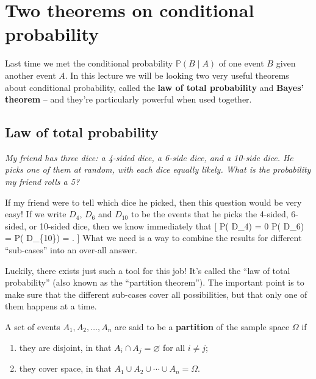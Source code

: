 \documentclass[
  letterpaper,
]{report}
\providecommand{\tightlist}{%
  \setlength{\itemsep}{0pt}\setlength{\parskip}{0pt}}\usepackage{longtable,booktabs,array}
\theoremstyle{definition}
\theoremstyle{definition}
\theoremstyle{remark}
\begin{document}
\hypertarget{L08-two-theorems}{%
\chapter{Two theorems on conditional
probability}\label{L08-two-theorems}}

Last time we met the conditional probability \(\mathbb P(B \mid A)\) of
one event \(B\) given another event \(A\). In this lecture we will be
looking two very useful theorems about conditional probability, called
the \textbf{law of total probability} and \textbf{Bayes' theorem} -- and
they're particularly powerful when used together.

\hypertarget{total-prob}{%
\section{Law of total probability}\label{total-prob}}

\leavevmode{}%
\emph{My friend has three dice: a 4-sided dice, a 6-side dice, and a
10-side dice. He picks one of them at random, with each dice equally
likely. What is the probability my friend rolls a 5?}

If my friend were to tell which dice he picked, then this question would
be very easy! If we write \(D_4\), \(D_6\) and \(D_{10}\) to be the
events that he picks the 4-sided, 6-sided, or 10-sided dice, then we
know immediately that {[} \mathbb P( \mid D\_4) = 0
\qquad \mathbb P( \mid D\_6) = 
\qquad \mathbb P( \mid D\_\{10\}) =  . {]}
What we need is a way to combine the results for different ``sub-cases''
into an over-all answer.

Luckily, there exists just such a tool for this job! It's called the
``law of total probability'' (also known as the ``partition theorem'').
The important point is to make sure that the different sub-cases cover
all possibilities, but that only one of them happens at a time.

A set of events \(A_1, A_2, \dots, A_n\) are said to be a
\textbf{partition} of the sample space \(\Omega\) if

\begin{enumerate}
\def\labelenumi{\arabic{enumi}.}
\tightlist
\item
  they are disjoint, in that \(A_i \cap A_j = \varnothing\) for all
  \(i \neq j\);
\item
  they cover space, in that
  \(A_1 \cup A_2 \cup \cdots \cup A_n = \Omega\).
\end{enumerate}
\end{document}
